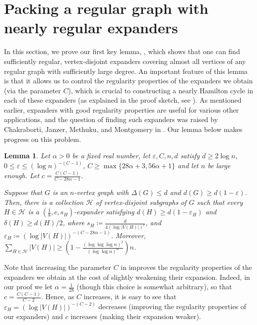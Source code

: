 \documentclass[10pt]{article}
\theoremstyle{plain}
\numberwithin{theorem}{section}
\newtheorem{lemma}[theorem]{Lemma}
\theoremstyle{definition}
\theoremstyle{remark}
\newcommand{\cH}{\mathcal{H}}
\newcommand{\eps}{\varepsilon}
\theoremstyle{plain}
\begin{document}
\section{Packing a regular graph with nearly regular expanders}
\label{sec:packingwithexpanders}

In this section, we prove our first key lemma, , which shows that one can find sufficiently regular, vertex-disjoint expanders covering almost all vertices of any regular graph with sufficiently large degree. An important feature of this lemma is that it allows us to control the regularity properties of the expanders we obtain (via the parameter $C$), which is crucial to constructing a nearly Hamilton cycle in each of these expanders (as explained in the proof sketch, see ).
As mentioned earlier, expanders with good regularity properties are useful for various other applications, and the question of finding such expanders was raised by Chakraborti, Janzer, Methuku, and Montgomery in \cite{chakraborti2024edge}. Our lemma below makes progress on this problem.

\begin{lemma}
	\label{cor:expandercoverstrong}
	Let $\alpha > 0$ be a fixed real number, let $\eps, C, n, d$ satisfy $d \ge 2 \log n$, $0 \le \eps \le (\log n)^{-(C-1)}$, $C \ge \max\{28\alpha + 3, 56\alpha + 1\}$ and let $n$ be large enough. Let $c = \frac{C(C-1)}{C-28 \alpha - 1}$. 

	Suppose that $G$ is an $n$-vertex graph with $\Delta(G) \le d$ and $d(G) \ge d(1- \eps)$. Then, there is a collection $\cH$ of vertex-disjoint subgraphs of $G$ such that every $H \in \cH$ is a $(\frac{1}{8}, c, s_H)$-expander satisfying $d(H) \ge d(1 - \eps_H)$ and $\delta(H) \ge d(H)/2$, where $s_H \coloneqq \frac{d}{4 (\log |V(H)|)^c}$, and $\eps_H \coloneqq (\log |V(H)|)^{-(C-28 \alpha - 1)}$. Moreover, $\sum_{H \in \cH} |V(H)| \ge (1 - \frac{(\log \log \log n)^2}{(\log \log n)^{\alpha}})n$. 
\end{lemma}

Note that increasing the parameter $C$ in  improves the regularity properties of the expanders we obtain at the cost of slightly weakening their expansion. Indeed, in our proof we let $\alpha  = \frac{1}{28}$ (though this choice is somewhat arbitrary), so that $c = \frac{C(C-1)}{C- 2}$. Hence, as $C$ increases, it is easy to see that $\eps_H = (\log |V(H)|)^{-(C-2)}$ decreases (improving the regularity properties of our expanders) and $c$ increases (making their expansion weaker).
\end{document}
